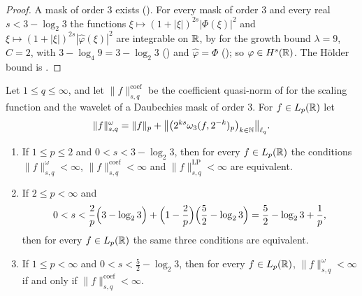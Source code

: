 \begin{proof}
\leanok
{}
A mask of order $3$ exists (). For every mask of order $3$ and
every real $s < 3 - \log_2 3$ the functions $\xi \mapsto (1 + |\xi|)^{2s} |\Phi(\xi)|^2$ and
$\xi \mapsto (1 + |\xi|)^{2s} |\widehat\varphi(\xi)|^2$ are integrable on $\mathbb{R}$, by
 for the growth bound $\lambda = 9$, $C = 2$, with
$3 - \log_4 9 = 3 - \log_2 3$ () and $\widehat\varphi = \Phi$
(); so $\varphi \in H^s(\mathbb{R})$. The H\"older bound is
.
\end{proof}

\begin{theorem}
\label{thm:daub-besov-order-three}
\leanok
{}
Let $1 \leq q \leq \infty$, and let $\|f\|^{\mathrm{coef}}_{s,q}$ be the coefficient quasi-norm of
 for the scaling function and the wavelet of a Daubechies mask of order
$3$. For $f \in L_p(\mathbb{R})$ let
\[
  \|f\|^{\omega}_{s,q} = \|f\|_p
  + \bigl\|\bigl(2^{ks} \omega_3(f, 2^{-k})_p\bigr)_{k \in \mathbb{N}}\bigr\|_{\ell_q} .
\]
\begin{enumerate}
  \item If $1 \leq p \leq 2$ and $0 < s < 3 - \log_2 3$, then for every $f \in L_p(\mathbb{R})$ the
    conditions $\|f\|^{\omega}_{s,q} < \infty$, $\|f\|^{\mathrm{coef}}_{s,q} < \infty$ and
    $\|f\|^{\mathrm{LP}}_{s,q} < \infty$ are equivalent.
  \item If $2 \leq p < \infty$ and
    \[
      0 < s < \frac2p \Bigl(3 - \log_2 3\Bigr) + \Bigl(1 - \frac2p\Bigr)
      \Bigl(\frac52 - \log_2 3\Bigr) = \frac52 - \log_2 3 + \frac1p ,
    \]
    then for every $f \in L_p(\mathbb{R})$ the same three conditions are equivalent.
  \item If $1 \leq p < \infty$ and $0 < s < \frac52 - \log_2 3$, then for every $f \in L_p(\mathbb{R})$,
    $\|f\|^{\omega}_{s,q} < \infty$ if and only if $\|f\|^{\mathrm{coef}}_{s,q} < \infty$.
\end{enumerate}
\end{theorem}

